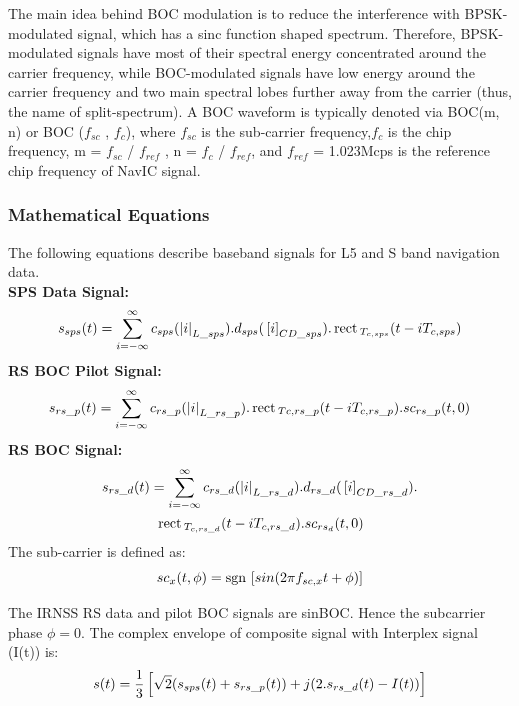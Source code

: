 The main idea behind BOC modulation is to reduce the interference with BPSK-modulated signal, which has a sinc function shaped spectrum. Therefore, BPSK-modulated signals have most of their spectral energy concentrated around the carrier frequency, while BOC-modulated signals have low energy around the carrier frequency and two main spectral lobes further away from the carrier (thus, the name of split-spectrum). 
A BOC waveform is typically denoted via BOC(m, n) or BOC ($f_{sc}$ , $f_c$), where $f_{ sc}$ is the sub-carrier frequency,$f_c$ is the chip frequency, m = $f_{sc}$ / $f_{ref}$ , n = $f_c$ / $f_{ref}$, and $f_{ref}$ = 1.023Mcps is the reference chip frequency of NavIC signal.

\subsubsection{Mathematical Equations}
The following equations describe baseband signals for L5 and S band navigation data.
\\
\textbf{SPS Data Signal:}
\begin{equation}
	s_{sps}(t) = \sum_{i=-\infty}^{\infty} c_{sps}(\left\vert i\right\vert_{L\_sps}) . d_{sps}({}\left[i\right]_{CD\_sps}) . \,\text{rect}\,_{T_{c,sps}}(t-iT_{c,sps})
\end{equation}
\textbf{RS BOC Pilot Signal:}
\begin{equation}
	s_{rs\_p}(t) = \sum_{i=-\infty}^{\infty} c_{rs\_p}(\left\vert i\right\vert_{L\_rs\_p}) . \,\text{rect}\,_{Tc,rs\_p}(t-iT_{c,rs\_p}). sc_{rs\_p}(t,0)
\end{equation}
\textbf{RS BOC Signal:}
\begin{multline}
	s_{rs\_d}(t) = \sum_{i=-\infty}^{\infty} c_{rs\_d}(\left\vert i\right\vert_{L\_rs\_d}) . d_{rs\_d}({}\left[i\right]_{CD\_rs\_d}).  \\ 
	                       \,\text{rect}\,_{T_{c,rs\_d}}(t-iT_{c,rs\_d}). sc_{rs_d}(t,0)
\end{multline}
The sub-carrier is defined as:
\begin{equation}
	sc_x(t,\phi) = \mathop{\mathrm{sgn}}{}\left[sin(2 \pi f_{sc,x}t + \phi)\right]
\end{equation}

\noindent The IRNSS RS data and pilot BOC signals are sinBOC. Hence the subcarrier phase $\phi=0$.
The complex envelope of composite signal with Interplex signal (I(t)) is:
\begin{equation}
s(t) = \dfrac{1}{3} {}\left[\sqrt{2} (s_{sps}(t) + s_{rs\_p}(t)) + j(2. s_{rs\_d}(t) - I(t))\right] 
\end{equation}

